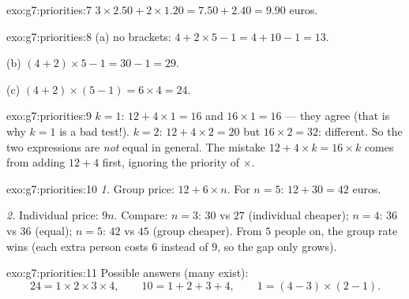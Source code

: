 \begin{solution}{exo:g7:priorities:7}
$3 \times 2.50 + 2 \times 1.20 = 7.50 + 2.40 = 9.90$ euros.
\end{solution}

\begin{solution}{exo:g7:priorities:8}
(a) no brackets: $4 + 2 \times 5 - 1 = 4 + 10 - 1 = 13$.

(b) $(4 + 2) \times 5 - 1 = 30 - 1 = 29$.

(c) $(4 + 2) \times (5 - 1) = 6 \times 4 = 24$.
\end{solution}

\begin{solution}{exo:g7:priorities:9}
$k = 1$: $12 + 4 \times 1 = 16$ and $16 \times 1 = 16$ --- they agree
(that is why $k = 1$ is a bad test!). $k = 2$:
$12 + 4 \times 2 = 20$ but $16 \times 2 = 32$: different. So the two
expressions are \emph{not} equal in general. The mistake
$12 + 4 \times k = 16 \times k$ comes from adding $12 + 4$ first,
ignoring the priority of $\times$.
\end{solution}

\begin{solution}{exo:g7:priorities:10}
\emph{1.} Group price: $12 + 6 \times n$. For $n = 5$:
$12 + 30 = 42$ euros.

\emph{2.} Individual price: $9n$. Compare: $n = 3$: $30$ vs $27$
(individual cheaper); $n = 4$: $36$ vs $36$ (equal); $n = 5$: $42$ vs
$45$ (group cheaper). From $5$ people on, the group rate wins
(each extra person costs $6$ instead of $9$, so the gap only grows).
\end{solution}

\begin{solution}{exo:g7:priorities:11}
Possible answers (many exist):
\[
24 = 1 \times 2 \times 3 \times 4, \qquad
10 = 1 + 2 + 3 + 4, \qquad
1 = (4 - 3) \times (2 - 1).
\]
\end{solution}


